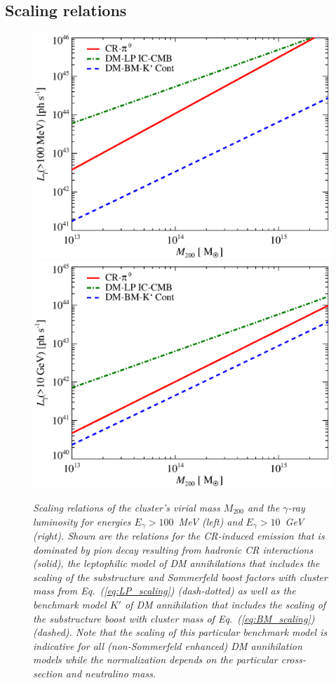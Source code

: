 \documentclass[10pt,aps,pra,reprint,amsmath,amsfonts,amssymb,showpacs,nofootinbib,floatfix]{revtex4-1}
\newcommand{\mvir}{M_{200}}
\begin{document}
\subsection{Scaling relations}

\begin{figure}
  \includegraphics[width=0.99\columnwidth]{figures/MLscaling.100M.eps}
  \includegraphics[width=0.99\columnwidth]{figures/MLscaling.10G.eps}
  \caption{\it Scaling relations of the cluster's virial mass $\mvir$ and the
    $\gamma$-ray luminosity for energies $E_\gamma>100$~MeV (left) and
    $E_\gamma>10$~GeV (right).  Shown are the relations for the CR-induced
    emission that is dominated by pion decay resulting from hadronic CR
    interactions (solid), the leptophilic model of DM annihilations that
    includes the scaling of the substructure and Sommerfeld boost factors with
    cluster mass from Eq.~(\ref{eq:LP_scaling}) (dash-dotted) as well as the
    benchmark model $K'$ of DM annihilation that includes the scaling of the
    substructure boost with cluster mass of Eq.~(\ref{eq:BM_scaling})
    (dashed). Note that the scaling of this particular benchmark model is
    indicative for all (non-Sommerfeld enhanced) DM annihilation models while
    the normalization depends on the particular cross-section and neutralino
    mass.}
\label{fig:lum_mass_scaling}
\end{figure}
\end{document}
